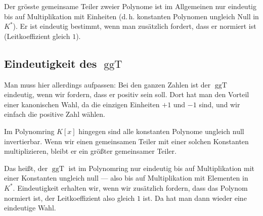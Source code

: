 \begin{math-stroke}

\begin{remark}
Der grösste gemeinsame Teiler zweier Polynome ist im Allgemeinen nur eindeutig bis auf Multiplikation mit Einheiten (d.\,h. konstanten Polynomen ungleich Null in $K^*$). Er ist eindeutig bestimmt, wenn man zusätzlich fordert, dass er normiert ist (Leitkoeffizient gleich $1$).
\end{remark}
\end{math-stroke}

\subsection{Eindeutigkeit des \texorpdfstring{$\operatorname{ggT}$}{ggT}}

\begin{spoken-clean}[00:28:47 - 00:30:06]
Man muss hier allerdings aufpassen: Bei den ganzen Zahlen ist der $\operatorname{ggT}$ eindeutig, wenn wir fordern, dass er positiv sein soll. Dort hat man den Vorteil einer kanonischen Wahl, da die einzigen Einheiten $+1$ und $-1$ sind, und wir einfach die positive Zahl wählen. 

Im Polynomring $K[x]$ hingegen sind alle konstanten Polynome ungleich null invertierbar. Wenn wir einen gemeinsamen Teiler mit einer solchen Konstanten multiplizieren, bleibt er ein größter gemeinsamer Teiler. 

Das heißt, der $\operatorname{ggT}$ ist im Polynomring nur eindeutig bis auf Multiplikation mit einer Konstanten ungleich null --- also bis auf Multiplikation mit Elementen in $K^*$. Eindeutigkeit erhalten wir, wenn wir zusätzlich fordern, dass das Polynom normiert ist, der Leitkoeffizient also gleich $1$ ist. Da hat man dann wieder eine eindeutige Wahl.
\end{spoken-clean}

